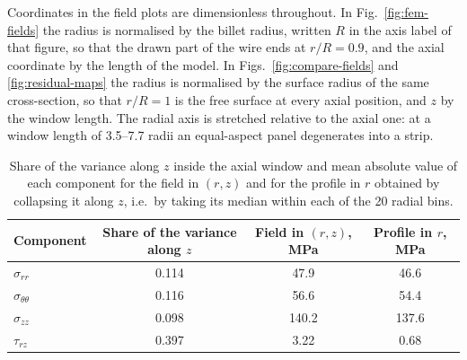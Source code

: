 \documentclass[subscriptcorrection,upint,varvw,barcolor=Goldenrod3,mathalfa=cal=euler,balance,hyphenate,french,pdf-a]{asmejour} %
\begin{document}
Coordinates in the field plots are dimensionless throughout. In Fig.~\ref{fig:fem-fields} the radius is normalised by the billet radius, written $R$ in the axis label of that figure, so that the drawn part of the wire ends at $r/R = 0.9$, and the axial coordinate by the length of the model. %
In Figs.~\ref{fig:compare-fields} and \ref{fig:residual-maps} the radius is normalised by the surface radius of the same cross-section, so that $r/R = 1$ is the free surface at every axial position, and $z$ by the window length. %
The radial axis is stretched relative to the axial one: at a window length of 3.5--7.7 radii an equal-aspect panel degenerates into a strip. %

\begin{table}[htbp]
\centering\small
\caption[Variance along $z$ and the effect of collapsing the field]{Share of the variance along $z$ inside the axial window and mean absolute value of each component for the field in $(r,z)$ and for the profile in $r$ obtained by collapsing it along $z$, i.e.\ by taking its median within each of the 20 radial bins.} %
\label{tab:zshare}
\begin{tabular}{@{}lccc@{}}
\toprule
Component & Share of the variance along $z$ & Field in $(r,z)$, MPa & Profile in $r$, MPa \\
\midrule
$\sigma_{rr}$           & 0.114 & 47.9  & 46.6  \\ %
$\sigma_{\theta\theta}$ & 0.116 & 56.6  & 54.4  \\ %
$\sigma_{zz}$           & 0.098 & 140.2 & 137.6 \\ %
$\tau_{rz}$             & 0.397 & 3.22  & 0.68  \\ %
\bottomrule
\end{tabular}
\end{table}
\end{document}
